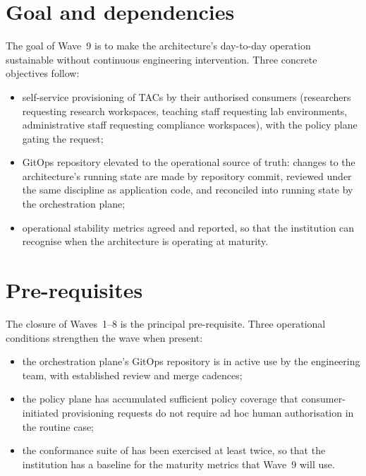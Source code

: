 \section{Goal and dependencies}
\label{sec:w9-goal}

The goal of Wave~9 is to make the architecture's day-to-day
operation sustainable without continuous engineering intervention.
Three concrete objectives follow:

\begin{itemize}[leftmargin=1.5em,nosep]
  \item self-service provisioning of TACs by their authorised
    consumers (researchers requesting research workspaces,
    teaching staff requesting lab environments,
    administrative staff requesting compliance workspaces),
    with the policy plane gating the request;
  \item GitOps repository elevated to the operational source of
    truth: changes to the architecture's running state are made
    by repository commit, reviewed under the same discipline as
    application code, and reconciled into running state by the
    orchestration plane;
  \item operational stability metrics agreed and reported, so
    that the institution can recognise when the architecture is
    operating at maturity.
\end{itemize}

\section{Pre-requisites}
\label{sec:w9-prereq}

The closure of Waves~1--8 is the principal pre-requisite. Three
operational conditions strengthen the wave when present:

\begin{itemize}[leftmargin=1.5em,nosep]
  \item the orchestration plane's GitOps repository is in active
    use by the engineering team, with established review and
    merge cadences;
  \item the policy plane has accumulated sufficient policy
    coverage that consumer-initiated provisioning requests do
    not require ad hoc human authorisation in the routine case;
  \item the conformance suite of  has
    been exercised at least twice, so that the institution has
    a baseline for the maturity metrics that Wave~9 will use.
\end{itemize}

